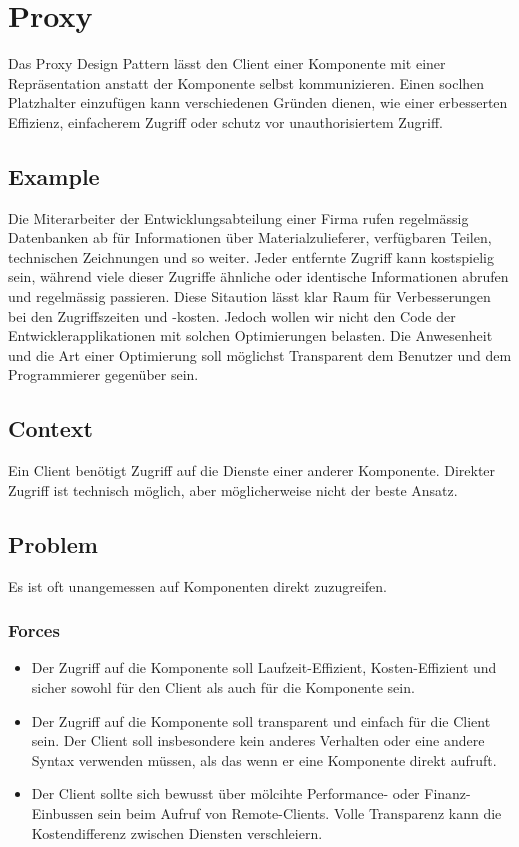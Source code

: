 \section{Proxy}


Das Proxy Design Pattern lässt den Client einer Komponente mit einer Repräsentation anstatt der Komponente selbst kommunizieren. Einen soclhen Platzhalter einzufügen kann verschiedenen Gründen dienen, wie einer erbesserten Effizienz, einfacherem Zugriff oder schutz vor unauthorisiertem Zugriff.

\subsection*{Example}


Die Miterarbeiter der Entwicklungsabteilung einer Firma rufen regelmässig Datenbanken ab für Informationen über Materialzulieferer, verfügbaren Teilen, technischen Zeichnungen und so weiter. Jeder entfernte Zugriff kann kostspielig sein, während viele dieser Zugriffe ähnliche oder identische Informationen abrufen und regelmässig passieren. Diese Sitaution lässt klar Raum für Verbesserungen bei den Zugriffszeiten und -kosten. Jedoch wollen wir nicht den Code der Entwicklerapplikationen mit solchen Optimierungen belasten. Die Anwesenheit und die Art einer Optimierung soll möglichst Transparent dem Benutzer und dem Programmierer gegenüber sein.

\subsection*{Context}


Ein Client benötigt Zugriff auf die Dienste einer anderer Komponente. Direkter Zugriff ist technisch möglich, aber möglicherweise nicht der beste Ansatz.

\subsection*{Problem}


Es ist oft unangemessen auf Komponenten direkt zuzugreifen.

\subsubsection*{Forces}

\begin{itemize}
	\item Der Zugriff auf die Komponente soll Laufzeit-Effizient, Kosten-Effizient und sicher sowohl für den Client als auch für die Komponente sein.
	\item Der Zugriff auf die Komponente soll transparent und einfach für die Client sein. Der Client soll insbesondere kein anderes Verhalten oder eine andere Syntax verwenden müssen, als das wenn er eine Komponente direkt aufruft.
	\item Der Client sollte sich bewusst über mölcihte Performance- oder Finanz-Einbussen sein beim Aufruf von Remote-Clients. Volle Transparenz kann die Kostendifferenz zwischen Diensten verschleiern.
\end{itemize}

